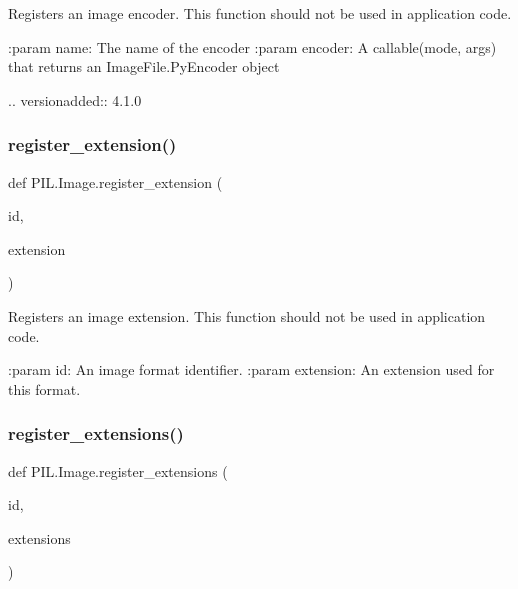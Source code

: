 \begin{DoxyVerb}Registers an image encoder.  This function should not be
used in application code.

:param name: The name of the encoder
:param encoder: A callable(mode, args) that returns an
                ImageFile.PyEncoder object

.. versionadded:: 4.1.0
\end{DoxyVerb}
 \mbox{\label{namespacePIL_1_1Image_ae528317f817b321c71f8844e3489073e}} 
\subsubsection{\texorpdfstring{register\+\_\+extension()}{register\_extension()}}
{\footnotesize\ttfamily def P\+I\+L.\+Image.\+register\+\_\+extension (\begin{DoxyParamCaption}\item[{}]{id,  }\item[{}]{extension }\end{DoxyParamCaption})}

\begin{DoxyVerb}Registers an image extension.  This function should not be
used in application code.

:param id: An image format identifier.
:param extension: An extension used for this format.
\end{DoxyVerb}
 \mbox{\label{namespacePIL_1_1Image_aef09e6bf33d8abe644fa20fe1b473d55}} 
\subsubsection{\texorpdfstring{register\+\_\+extensions()}{register\_extensions()}}
{\footnotesize\ttfamily def P\+I\+L.\+Image.\+register\+\_\+extensions (\begin{DoxyParamCaption}\item[{}]{id,  }\item[{}]{extensions }\end{DoxyParamCaption})}

